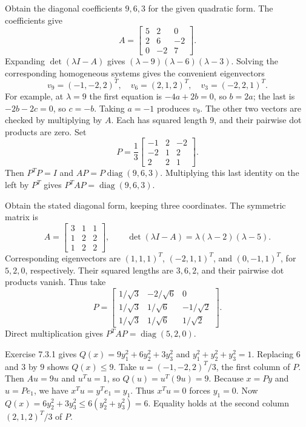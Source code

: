 \goal Obtain the diagonal coefficients $9,6,3$ for the given quadratic form.
The coefficients give
\[
 A=\begin{bmatrix}5&2&0\\2&6&-2\\0&-2&7\end{bmatrix}.
\]
Expanding $\det(\lambda I-A)$ gives
$(\lambda-9)(\lambda-6)(\lambda-3)$. Solving the corresponding
homogeneous systems gives the convenient eigenvectors
\[
 v_9=(-1,-2,2)^T,\quad v_6=(2,1,2)^T,\quad v_3=(-2,2,1)^T.
\]
For example, at $\lambda=9$ the first equation is $-4a+2b=0$,
so $b=2a$; the last is $-2b-2c=0$, so $c=-b$. Taking $a=-1$
produces $v_9$. The other two vectors are checked by multiplying by $A$.
Each has squared length $9$, and their pairwise dot products are zero.
Set
\[
 P=\frac13\begin{bmatrix}-1&2&-2\\-2&1&2\\2&2&1\end{bmatrix}.
\]
Then $P^TP=I$ and $AP=P\operatorname{diag}(9,6,3)$. Multiplying this
last identity on the left by $P^T$ gives $P^TAP=\operatorname{diag}(9,6,3)$.

\goal Obtain the stated diagonal form, keeping three coordinates.
The symmetric matrix is
\[
 A=\begin{bmatrix}3&1&1\\1&2&2\\1&2&2\end{bmatrix},\qquad
 \det(\lambda I-A)=\lambda(\lambda-2)(\lambda-5).
\]
Corresponding eigenvectors are $(1,1,1)^T$, $(-2,1,1)^T$, and
$(0,-1,1)^T$, for $5,2,0$, respectively. Their squared lengths are
$3,6,2$, and their pairwise dot products vanish. Thus take
\[
 P=\begin{bmatrix}
 1/\sqrt3&-2/\sqrt6&0\\
 1/\sqrt3&1/\sqrt6&-1/\sqrt2\\
 1/\sqrt3&1/\sqrt6&1/\sqrt2
 \end{bmatrix}.
\]
Direct multiplication gives $P^TAP=\operatorname{diag}(5,2,0)$.

Exercise 7.3.1 gives $Q(x)=9y_1^2+6y_2^2+3y_3^2$ and
$y_1^2+y_2^2+y_3^2=1$. Replacing $6$ and $3$ by $9$ shows $Q(x)\le9$.
Take $u=(-1,-2,2)^T/3$, the first column of $P$. Then $Au=9u$
and $u^Tu=1$, so $Q(u)=u^T(9u)=9$.
Because $x=Py$ and $u=Pe_1$, we have $x^Tu=y^Te_1=y_1$.
Thus $x^Tu=0$ forces $y_1=0$. Now
$Q(x)=6y_2^2+3y_3^2\le6(y_2^2+y_3^2)=6$.
Equality holds at the second column $(2,1,2)^T/3$ of $P$.


